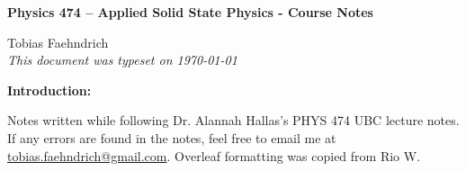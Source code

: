 \documentclass[10pt]{article}
\begin{document}
\begin{tcolorbox}
  \begin{center}
  \begin{Large}
    \textbf{Physics 474 – Applied Solid State Physics - Course Notes} \\
    \vspace{5pt}
  \end{Large}
  \begin{large}
        Tobias Faehndrich \\
\vspace{5pt}
    \emph{This document was typeset on \today}
  \end{large}
  \end{center}
\end{tcolorbox}

\begin{center}
  \textbf{Introduction:}

Notes written while following Dr. Alannah Hallas's PHYS 474 UBC lecture notes. If any errors are found in the notes, feel free to email me at \href{mailto:tobias.faehndrich@gmail.com}{tobias.faehndrich@gmail.com}. Overleaf formatting was copied from Rio W.

\end{center}
\tableofcontents

\newpage


\newpage



\newpage

\end{document}
